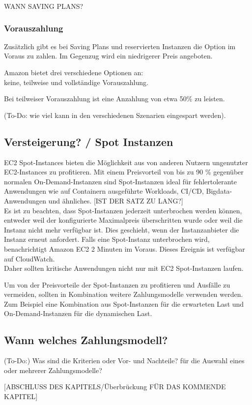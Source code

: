 WANN SAVING PLANS? 

\subsubsection{Vorauszahlung}
Zusätzlich gibt es bei Saving Plans und reservierten Instanzen die Option im Voraus zu zahlen.
Im Gegenzug wird ein niedrigerer Preis angeboten.

Amazon bietet drei verschiedene Optionen an:\\ 
keine, teilweise und vollständige Vorauszahlung.

Bei teilweiser Vorauszahlung ist eine Anzahlung von etwa 50\% zu leisten.

(To-Do: wie viel kann in den verschiedenen Szenarien eingespart werden).

\subsection{Versteigerung? / Spot Instanzen }
EC2 Spot-Instances bieten die Möglichkeit aus von anderen Nutzern ungenutzter EC2-Instances zu profitieren.
Mit einem Preisvorteil von bis zu 90 \% gegenüber normalen On-Demand-Instanzen sind Spot-Instanzen ideal für fehlertolerante Anwendungen wie auf Containern ausgeführte Workloads, CI/CD, Bigdata-Anwendungen und ähnliches.
[IST DER SATZ ZU LANG?]
\\
Es ist zu beachten, dass Spot-Instanzen jederzeit unterbrochen werden können, entweder weil der konfigurierte Maximalpreis überschritten wurde oder weil die Instanz nicht mehr verfügbar ist. Dies geschieht, wenn der Instanzanbieter die Instanz erneut anfordert. Falls eine Spot-Instanz unterbrochen wird, benachrichtigt Amazon EC2 2 Minuten im Voraus. Dieses Ereignis ist verfügbar auf CloudWatch.
\\
Daher sollten kritische Anwendungen nicht nur mit EC2 Spot-Instanzen laufen.

Um von der Preisvorteile der Spot-Instanzen zu profitieren und Ausfälle zu vermeiden, sollten in Kombination weitere Zahlungsmodelle verwenden werden.
\\
Zum Beispiel eine Kombination aus Spot-Instanzen für die erwarteten Last und On-Demand-Instanzen für die dynamischen Last.


\subsection{Wann welches Zahlungsmodell?} \label{sssec:num3.4}
(To-Do:) Was sind die Kriterien oder Vor- und Nachteile? für die Auswahl eines oder mehrerer Zahlungsmodelle?




[ABSCHLUSS DES KAPITELS/Überbrückung FÜR DAS KOMMENDE KAPITEL]